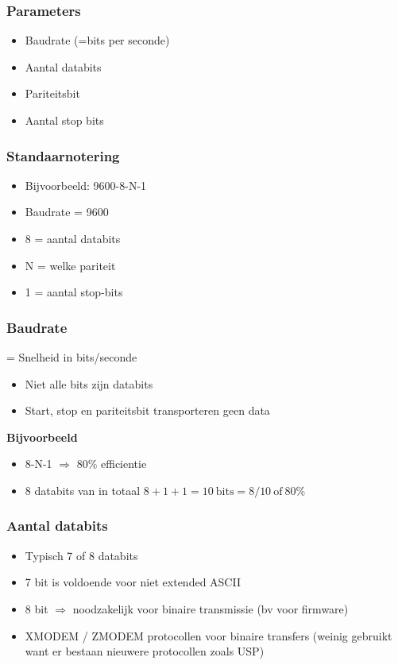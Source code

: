 \documentclass{article}
\newcommand{\bold}[1]{\textbf{#1}}
\begin{document}
\subsubsection{Parameters}
\begin{itemize}
    \item Baudrate (=bits per seconde)
    \item Aantal databits
    \item Pariteitsbit
    \item Aantal stop bits
\end{itemize}

\subsubsection{Standaarnotering}
\begin{itemize}
    \item Bijvoorbeeld: 9600-8-N-1
    \item Baudrate = 9600
    \item 8 = aantal databits
    \item N = welke pariteit
    \item 1 = aantal stop-bits
\end{itemize}

\subsubsection{Baudrate}
= Snelheid in bits/seconde
\begin{itemize}
    \item Niet alle bits zijn databits
    \item Start, stop en pariteitsbit transporteren geen data
\end{itemize}

\bold{Bijvoorbeeld}
\begin{itemize}
    \item 8-N-1 $\Rightarrow$ 80\% efficientie
    \item 8 databits van in totaal $8+1+1=10\ \text{bits} = 8/10\ \text{of}\ 80\%$
\end{itemize}

\subsubsection{Aantal databits}
\begin{itemize}
    \item Typisch 7 of 8 databits
    \item 7 bit is voldoende voor niet extended ASCII
    \item 8 bit $\Rightarrow$ noodzakelijk voor binaire transmissie (bv voor firmware)
    \item XMODEM / ZMODEM protocollen voor binaire transfers (weinig gebruikt want er bestaan nieuwere protocollen zoals USP)
\end{itemize}
\end{document}

